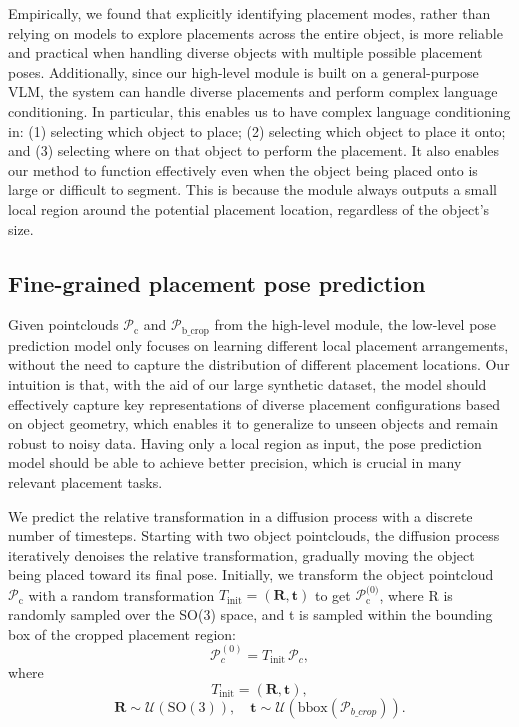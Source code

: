 Empirically, we found that explicitly identifying placement modes, rather than relying on models to explore placements across the entire object, is more reliable and practical when handling diverse objects with multiple possible placement poses. Additionally, since our high-level module is built on a general-purpose VLM, the system can handle diverse placements and perform complex language conditioning.
In particular, this enables us to have complex language conditioning in: (1) selecting which object to place; (2) selecting which object to place it onto; and (3) selecting where on that object to perform the placement.
It also enables our method to function effectively even when the object being placed onto is large or difficult to segment. This is because the module always outputs a small local region around the potential placement location, regardless of the object's size.


\subsection{Fine-grained placement pose prediction}
\label{subsec:placement_model}
Given pointclouds \( \mathcal{P}_{\text{c}} \) and \( \mathcal{P}_{\text{b\_crop}} \) from the high-level module, the low-level pose prediction model only focuses on learning different local placement arrangements, without the need to capture the distribution of different placement locations. Our intuition is that, with the aid of our large synthetic dataset, the model should effectively capture key representations of diverse placement configurations based on object geometry, which enables it to generalize to unseen objects and remain robust to noisy data.  Having only a local region as input, the pose prediction model should be able to achieve better precision, which is crucial in many relevant placement tasks.

 We predict the relative transformation in a diffusion process with a discrete number of timesteps. Starting with two object pointclouds, the diffusion process iteratively denoises the relative transformation, gradually moving the object being placed toward its final pose. Initially, we transform the object pointcloud \( \mathcal{P}_{\text{c}} \) with a random transformation \( T_{\text{init}} = (\mathbf{R}, \mathbf{t}) \) to get \( \mathcal{P}_{\text{c}}^{\text{(0)}} \), where R is randomly sampled over the SO(3) space, and t is sampled within the bounding box of the cropped placement region:
\begin{equation}
\mathcal{P}_c^{(0)} = T_{\text{init}}\, \mathcal{P}_c,
\end{equation}
where
\begin{equation}
T_{\text{init}} = (\mathbf{R}, \mathbf{t}),
\end{equation}
\begin{equation}
\mathbf{R} \sim \mathcal{U}(\mathrm{SO}(3)), \quad \mathbf{t} \sim \mathcal{U}(\text{bbox}(\mathcal{P}_{b\_crop})).
\end{equation}

